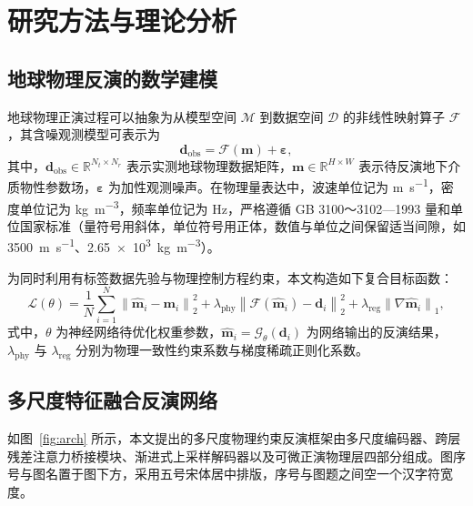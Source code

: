 \chapter{研究方法与理论分析}

\section{地球物理反演的数学建模}

地球物理正演过程可以抽象为从模型空间 $\mathcal{M}$ 到数据空间 $\mathcal{D}$ 的非线性映射算子 $\mathcal{F}$，其含噪观测模型可表示为
\begin{equation}
  \mathbf{d}_{\mathrm{obs}} = \mathcal{F}(\mathbf{m}) + \boldsymbol{\varepsilon},
  \label{eq:forward}
\end{equation}
其中，$\mathbf{d}_{\mathrm{obs}} \in \mathbb{R}^{N_t \times N_r}$ 表示实测地球物理数据矩阵，$\mathbf{m} \in \mathbb{R}^{H \times W}$ 表示待反演地下介质物性参数场，$\boldsymbol{\varepsilon}$ 为加性观测噪声。在物理量表达中，波速单位记为 \si{\meter\per\second}，密度单位记为 \si{\kilogram\per\cubic\meter}，频率单位记为 \si{\hertz}，严格遵循 GB 3100～3102—1993 量和单位国家标准（量符号用斜体，单位符号用正体，数值与单位之间保留适当间隙，如 \SI{3500}{\meter\per\second}、\SI{2.65e3}{\kilogram\per\cubic\meter}）。

为同时利用有标签数据先验与物理控制方程约束，本文构造如下复合目标函数：
\begin{equation}
  \mathcal{L}(\theta) = \frac{1}{N} \sum_{i=1}^{N} \left\| \hat{\mathbf{m}}_i - \mathbf{m}_i \right\|_2^2
  + \lambda_{\mathrm{phy}} \left\| \mathcal{F}(\hat{\mathbf{m}}_i) - \mathbf{d}_i \right\|_2^2
  + \lambda_{\mathrm{reg}} \left\| \nabla \hat{\mathbf{m}}_i \right\|_1,
  \label{eq:loss}
\end{equation}
式中，$\theta$ 为神经网络待优化权重参数，$\hat{\mathbf{m}}_i = \mathcal{G}_\theta(\mathbf{d}_i)$ 为网络输出的反演结果，$\lambda_{\mathrm{phy}}$ 与 $\lambda_{\mathrm{reg}}$ 分别为物理一致性约束系数与梯度稀疏正则化系数。

\section{多尺度特征融合反演网络}

如图~\ref{fig:arch} 所示，本文提出的多尺度物理约束反演框架由多尺度编码器、跨层残差注意力桥接模块、渐进式上采样解码器以及可微正演物理层四部分组成。图序号与图名置于图下方，采用五号宋体居中排版，序号与图题之间空一个汉字符宽度。

